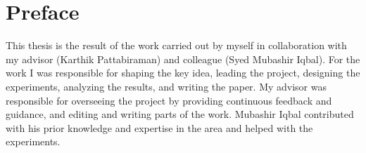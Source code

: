 
\chapter{Preface}
This thesis is the result of the work carried out by myself in collaboration with my advisor (Karthik Pattabiraman) and colleague (Syed Mubashir Iqbal). For the work I was responsible for shaping the key idea, leading the project, designing the experiments, analyzing the results, and writing the paper. My advisor was responsible for overseeing the project by providing continuous feedback and guidance, and editing and writing parts of the work. Mubashir Iqbal contributed with his prior knowledge and expertise in the area and helped with the experiments.

